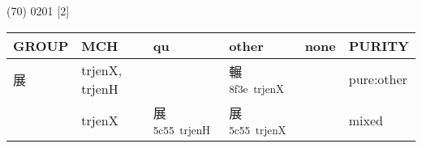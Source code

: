 \documentclass[14pt,a4paper]{scrartcl}
\begin{document}
(70) 0201 {[}2{]}

\begin{longtable}[c]{@{}llllll@{}}
\toprule
\begin{minipage}[b]{0.14\columnwidth}\raggedright\strut
GROUP
\strut\end{minipage} &
\begin{minipage}[b]{0.14\columnwidth}\raggedright\strut
MCH
\strut\end{minipage} &
\begin{minipage}[b]{0.14\columnwidth}\raggedright\strut
qu
\strut\end{minipage} &
\begin{minipage}[b]{0.14\columnwidth}\raggedright\strut
other
\strut\end{minipage} &
\begin{minipage}[b]{0.14\columnwidth}\raggedright\strut
none
\strut\end{minipage} &
\begin{minipage}[b]{0.14\columnwidth}\raggedright\strut
PURITY
\strut\end{minipage}\tabularnewline
\midrule
\endhead
\begin{minipage}[t]{0.14\columnwidth}\raggedright\strut
展
\strut\end{minipage} &
\begin{minipage}[t]{0.14\columnwidth}\raggedright\strut
trjenX, trjenH
\strut\end{minipage} &
\begin{minipage}[t]{0.14\columnwidth}\raggedright\strut
\strut\end{minipage} &
\begin{minipage}[t]{0.14\columnwidth}\raggedright\strut
輾\textsuperscript{8f3e~trjenX}
\strut\end{minipage} &
\begin{minipage}[t]{0.14\columnwidth}\raggedright\strut
\strut\end{minipage} &
\begin{minipage}[t]{0.14\columnwidth}\raggedright\strut
pure:other
\strut\end{minipage}\tabularnewline
\begin{minipage}[t]{0.14\columnwidth}\raggedright\strut
𧝑
\strut\end{minipage} &
\begin{minipage}[t]{0.14\columnwidth}\raggedright\strut
trjenX
\strut\end{minipage} &
\begin{minipage}[t]{0.14\columnwidth}\raggedright\strut
展\textsuperscript{5c55~trjenH}
\strut\end{minipage} &
\begin{minipage}[t]{0.14\columnwidth}\raggedright\strut
展\textsuperscript{5c55~trjenX}
\strut\end{minipage} &
\begin{minipage}[t]{0.14\columnwidth}\raggedright\strut
\strut\end{minipage} &
\begin{minipage}[t]{0.14\columnwidth}\raggedright\strut
mixed
\strut\end{minipage}\tabularnewline
\bottomrule
\end{longtable}
\end{document}

